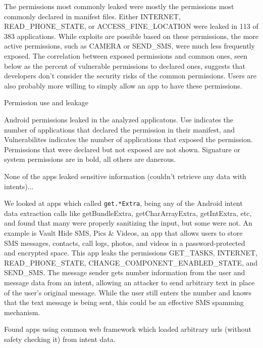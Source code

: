 \documentclass[12pt,a4paper]{article}
\begin{document}
The permissions most commonly leaked were mostly the permissions most commonly
declared in manifest files. Either INTERNET, READ\_PHONE\_STATE, or
ACCESS\_FINE\_LOCATION were leaked in 113 of 383 applications. While exploits
are possible based on these permissions, the more active permissions, such as
CAMERA or SEND\_SMS, were much less frequently exposed. The correlation between
exposed permissions and common ones, seen below as the percent of vulnerable
permissions to declared ones, suggests that developers don't consider the
security risks of the common permissions. Users are also probably more willing
to simply allow an app to have these permissions.
\begin{table}
\caption{Permission use and leakage}

\caption*{Android permissions leaked in the analyzed applicatons. Use indicates
  the number of applications that declared the permission in their
  manifest, and Vulnerabilites indicates the number of applications that
  exposed the permission.  Permissions that were declared but not exposed
  are not shown. Signature or system permissions are in bold, all others
  are danerous.}
\end{table}
None of the apps leaked sensitive information (couldn't retrieve any data with
intents)...

We looked at apps which called \texttt{get.*Extra}, being any of the Android
intent data extraction calls like getBundleExtra, getCharArrayExtra,
getIntExtra, etc, and found that many were properly sanitizing the input, but
some were not. An example is Vault Hide SMS, Pics \& Videos, an app that allows
users to store SMS messages, contacts, call logs, photos, and videos in a
password-protected and encrypted space. This app leaks the permissions
GET\_TASKS, INTERNET, READ\_PHONE\_STATE, CHANGE\_COMPONENT\_ENABLED\_STATE, and
SEND\_SMS. The message sender gets number information from the user and message
data from an intent, allowing an attacker to send arbitrary text in place of the
user's original message. While the user still enters the number and knows that
the text message is being sent, this could be an effective SMS spamming
mechanism.

Found apps using common web framework which loaded arbitrary urls (without
safety checking it) from intent data.
\end{document}
